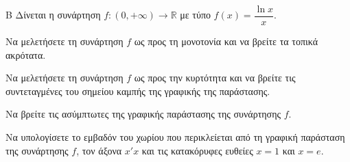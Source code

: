 \begin{thema}{Β}
Δίνεται η συνάρτηση $f:(0, +\infty) \to \mathbb{R}$ με τύπο $f(x) = \dfrac{\ln x}{x}$.
\begin{erwthma}
\item Να μελετήσετε τη συνάρτηση $f$ ως προς τη μονοτονία και να βρείτε τα τοπικά ακρότατα.
\item Να μελετήσετε τη συνάρτηση $f$ ως προς την κυρτότητα και να βρείτε τις συντεταγμένες του σημείου καμπής της γραφικής της παράστασης.
\item Να βρείτε τις ασύμπτωτες της γραφικής παράστασης της συνάρτησης $f$.
\item Να υπολογίσετε το εμβαδόν του χωρίου που περικλείεται από τη γραφική παράσταση της συνάρτησης $f$, τον άξονα $x'x$ και τις κατακόρυφες ευθείες $x = 1$ και $x = e$.
\end{erwthma}
\end{thema}
